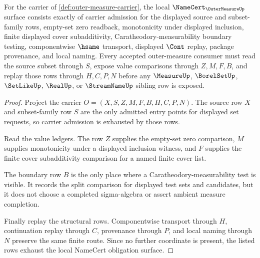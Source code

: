 \begin{theorem}
\label{thm:outer-measure-namecert-obligations}
For the carrier of \autoref{def:outer-measure-carrier}, the local $\NameCert_{\OuterMeasureUp}$ surface consists exactly of carrier admission for the displayed source and subset-family rows, empty-set zero readback, monotonicity under displayed inclusion, finite displayed cover subadditivity, Caratheodory-measurability boundary testing, componentwise $\hsame$ transport, displayed $\Cont$ replay, package provenance, and local naming. Every accepted outer-measure consumer must read the source subset through $S$, expose value comparisons through $Z,M,F,B$, and replay those rows through $H,C,P,N$ before any $\MeasureUp$, $\BorelSetUp$, $\SetLikeUp$, $\RealUp$, or $\StreamNameUp$ sibling row is exposed.
\end{theorem}
\begin{proof}
Project the carrier $O=(X,S,Z,M,F,B,H,C,P,N)$. The source row $X$ and subset-family row $S$ are the only admitted entry points for displayed set requests, so carrier admission is exhausted by those rows.

Read the value ledgers. The row $Z$ supplies the empty-set zero comparison, $M$ supplies monotonicity under a displayed inclusion witness, and $F$ supplies the finite cover subadditivity comparison for a named finite cover list.

The boundary row $B$ is the only place where a Caratheodory-measurability test is visible. It records the split comparison for displayed test sets and candidates, but it does not choose a completed sigma-algebra or assert ambient measure completion.

Finally replay the structural rows. Componentwise transport through $H$, continuation replay through $C$, provenance through $P$, and local naming through $N$ preserve the same finite route. Since no further coordinate is present, the listed rows exhaust the local NameCert obligation surface.
\end{proof}

